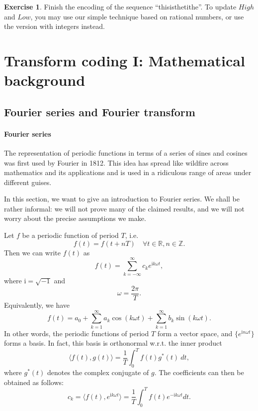 \documentclass[a4paper, 11pt, openany]{book}
\numberwithin{equation}{section}
\theoremstyle{plain}
\theoremstyle{definition}
\newtheorem{exercise}   {Exercise}  [section]
\newcommand{\Z}{\mathbb{Z}}
\newcommand{\R}{\mathbb{R}}
\renewcommand{\i}{\mathrm{i}}
\begin{document}
\begin{exercise}
Finish the encoding of the sequence ``this\textvisiblespace is\textvisiblespace the\textvisiblespace tithe''. To update $High$ and $Low$, you may use our simple technique based on rational numbers, or use the version with integers instead.
\end{exercise}

















\section{Transform coding I: Mathematical background}
\label{sec:06}



\subsection{Fourier series and Fourier transform}

\paragraph{Fourier series}
The representation of periodic functions in terms of a series of sines and cosines was first used by Fourier in 1812. This idea has spread like wildfire across mathematics and its applications and is used in a ridiculous range of areas under different guises.

In this section, we want to give an introduction to Fourier series. We shall be rather informal: we will not prove many of the claimed results, and we will not worry about the precise assumptions we make.

Let $f$ be a periodic function of period $T$, i.e.
\[
    f(t) = f(t + nT) \quad \forall t \in \R, n \in \Z.
\]
Then we can write $f(t)$ as
\[
    f(t) = \sum_{k=-\infty}^\infty c_k e^{\i k \omega t},
\]
where $\i = \sqrt{-1}$ and
\[
    \omega = \frac{2 \pi}{ T }.
\]
Equivalently, we have
\[
    f(t) = a_0 + \sum_{k=1}^\infty a_k \cos ( k \omega t ) + \sum_{k=1}^\infty b_k \sin ( k \omega t ).
\]
In other words, the periodic functions of period $T$ form a vector space, and $\{ e^{\i n \omega t} \}$ forms a basis. In fact, this basis is orthonormal w.r.t. the inner product
\[
    \langle f(t), g(t) \rangle = \frac{1}{T} \int_0^T f(t) g^*(t) \ dt, 
\]
where $g^*(t)$ denotes the complex conjugate of $g$. The coefficients can then be obtained as follows:
\begin{equation} \label{eq:fourier}
    c_k = \langle f(t), e^{\i k \omega t} \rangle = \frac{1}{T} \int_0^T f(t) e^{-\i k \omega t} dt. 
\end{equation}
\end{document}
